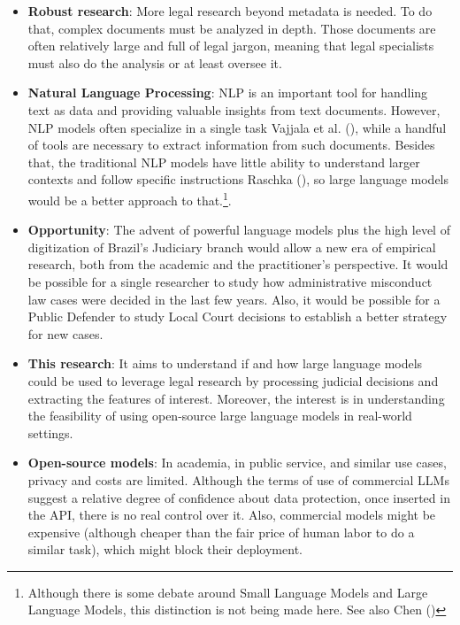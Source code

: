 \documentclass[
  12pt,
]{article}
\begin{document}
\begin{itemize}
\item
  \textbf{Robust research}: More legal research beyond metadata is
  needed. To do that, complex documents must be analyzed in depth. Those
  documents are often relatively large and full of legal jargon, meaning
  that legal specialists must also do the analysis or at least oversee
  it.
\item
  \textbf{Natural Language Processing}: NLP is an important tool for
  handling text as data and providing valuable insights from text
  documents. However, NLP models often specialize in a single task
  Vajjala et al. (), while a
  handful of tools are necessary to extract information from such
  documents. Besides that, the traditional NLP models have little
  ability to understand larger contexts and follow specific instructions
  Raschka (), so large language
  models would be a better approach to that.\footnote{Although there is
    some debate around Small Language Models and Large Language Models,
    this distinction is not being made here. See also Chen
    ()}.
\item
  \textbf{Opportunity}: The advent of powerful language models plus the
  high level of digitization of Brazil's Judiciary branch would allow a
  new era of empirical research, both from the academic and the
  practitioner's perspective. It would be possible for a single
  researcher to study how administrative misconduct law cases were
  decided in the last few years. Also, it would be possible for a Public
  Defender to study Local Court decisions to establish a better strategy
  for new cases.
\item
  \textbf{This research}: It aims to understand if and how large
  language models could be used to leverage legal research by processing
  judicial decisions and extracting the features of interest. Moreover,
  the interest is in understanding the feasibility of using open-source
  large language models in real-world settings.
\item
  \textbf{Open-source models}: In academia, in public service, and
  similar use cases, privacy and costs are limited. Although the terms
  of use of commercial LLMs suggest a relative degree of confidence
  about data protection, once inserted in the API, there is no real
  control over it. Also, commercial models might be expensive (although
  cheaper than the fair price of human labor to do a similar task),
  which might block their deployment.
\end{itemize}
\end{document}
